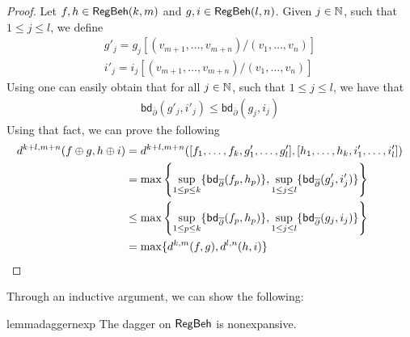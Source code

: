 \begin{proof}
	Let $f,h \in \mathsf{RegBeh}(k,m)$ and $g,i \in \mathsf{RegBeh}(l,n)$. Given $j \in \mathbb{N}$, such that $1 \leq j \leq l$, we define
	\begin{gather*}
	g'_j = g_j[(v_{m + 1}, \dots, v_{m + n})/(v_1, \dots, v_n)]\\
	i'_j = i_j[(v_{m + 1}, \dots, v_{m + n})/(v_1, \dots, v_n)]
	\end{gather*}
	Using  one can easily obtain that for all $j \in \mathbb{N}$, such that $1 \leq j \leq l$, we have that
	\begin{align*}
		\mathsf{bd}_{\overline\partial} (g'_j, i'_j) \leq \mathsf{bd}_{\overline\partial} (g_j, i_j)
	\end{align*}
	Using that fact, we can prove the following
	\begin{align*}
		d^{k + l, m + n}(f \oplus g, h \oplus i) &= d^{k + l, m + n}([ f_1, \dots, f_k, g'_1, \dots, g'_l],[ h_1, \dots, h_k, i'_1, \dots, i'_l])\\
		&=\max \left\{\sup_{1 \leq p \leq k}\{\mathsf{bd}_{\overline\partial} (f_p, h_p)\}, \sup_{1 \leq j \leq l} \{\mathsf{bd}_{\overline\partial} (g'_j, i'_j)\} \right\}\\
		&\leq \max \left\{\sup_{1 \leq p \leq k}\{\mathsf{bd}_{\overline\partial} (f_p, h_p)\}, \sup_{1 \leq j \leq l} \{\mathsf{bd}_{\overline\partial} (g_j, i_j)\} \right\}\\
		&= \max \{d^{k,m}(f,g), d^{l,n}(h,i)\} \tag*{\hfill\qedhere}
	\end{align*}
\end{proof}
Through an inductive argument, we can show the following:
\begin{restatable}{lemma}{daggernexp}\label{lem:dagger_nonexpansive}
	The dagger on $\mathsf{RegBeh}$ is nonexpansive.
\end{restatable}
